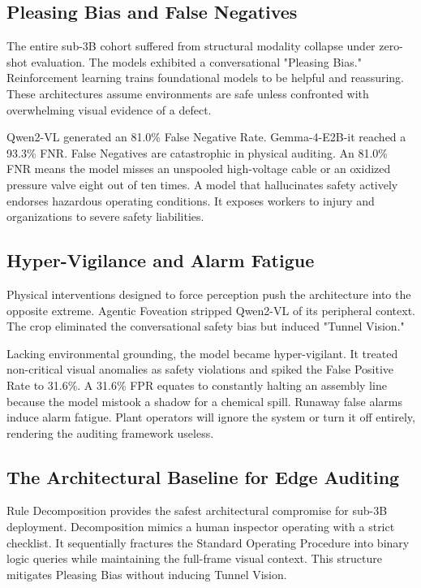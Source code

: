 \documentclass{article}
\begin{document}
\subsection*{Pleasing Bias and False Negatives}

The entire sub-3B cohort suffered from structural modality collapse under zero-shot evaluation. The models exhibited a conversational "Pleasing Bias." Reinforcement learning trains foundational models to be helpful and reassuring. These architectures assume environments are safe unless confronted with overwhelming visual evidence of a defect. 

Qwen2-VL generated an 81.0\% False Negative Rate. Gemma-4-E2B-it reached a 93.3\% FNR. False Negatives are catastrophic in physical auditing. An 81.0\% FNR means the model misses an unspooled high-voltage cable or an oxidized pressure valve eight out of ten times. A model that hallucinates safety actively endorses hazardous operating conditions. It exposes workers to injury and organizations to severe safety liabilities.

\subsection*{Hyper-Vigilance and Alarm Fatigue}

Physical interventions designed to force perception push the architecture into the opposite extreme. Agentic Foveation stripped Qwen2-VL of its peripheral context. The crop eliminated the conversational safety bias but induced "Tunnel Vision." 

Lacking environmental grounding, the model became hyper-vigilant. It treated non-critical visual anomalies as safety violations and spiked the False Positive Rate to 31.6\%. A 31.6\% FPR equates to constantly halting an assembly line because the model mistook a shadow for a chemical spill. Runaway false alarms induce alarm fatigue. Plant operators will ignore the system or turn it off entirely, rendering the auditing framework useless.

\subsection*{The Architectural Baseline for Edge Auditing}

Rule Decomposition provides the safest architectural compromise for sub-3B deployment. Decomposition mimics a human inspector operating with a strict checklist. It sequentially fractures the Standard Operating Procedure into binary logic queries while maintaining the full-frame visual context. This structure mitigates Pleasing Bias without inducing Tunnel Vision. 
\end{document}
